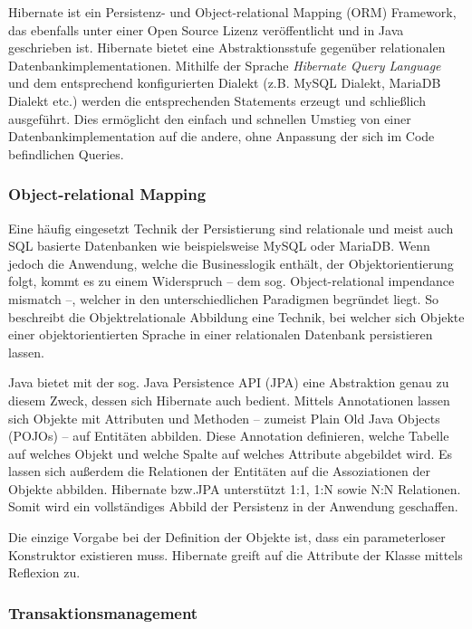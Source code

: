 			Hibernate ist ein Persistenz- und Object-relational Mapping (\ac{ORM}) Framework, das ebenfalls unter einer Open Source Lizenz veröffentlicht und in Java geschrieben ist. Hibernate bietet eine Abstraktionsstufe gegenüber relationalen Datenbankimplementationen. Mithilfe der Sprache \textit{Hibernate Query Language} und dem entsprechend konfigurierten Dialekt (z.B. MySQL Dialekt, MariaDB Dialekt etc.) werden die entsprechenden Statements erzeugt und schließlich ausgeführt. Dies ermöglicht den einfach und schnellen Umstieg von einer Datenbankimplementation auf die andere, ohne Anpassung der sich im Code befindlichen Queries. 
			
			\subsubsection{Object-relational Mapping} %
		
				Eine häufig eingesetzt Technik der Persistierung sind relationale und meist auch \ac{SQL} basierte Datenbanken wie beispielsweise MySQL oder MariaDB. Wenn jedoch die Anwendung, welche die Businesslogik enthält, der Objektorientierung folgt, kommt es zu einem Widerspruch -- dem sog. Object-relational impendance mismatch --, welcher in den unterschiedlichen Paradigmen begründet liegt. So beschreibt die Objektrelationale Abbildung eine Technik, bei welcher sich Objekte einer objektorientierten Sprache in einer relationalen Datenbank persistieren lassen. 
					
				Java bietet mit der sog. Java Persistence API (\ac{JPA}) eine Abstraktion genau zu diesem Zweck, dessen sich Hibernate auch bedient. Mittels Annotationen lassen sich Objekte mit Attributen und Methoden -- zumeist Plain Old Java Objects (\ac{POJO}s) -- auf Entitäten abbilden. Diese Annotation definieren, welche Tabelle auf welches Objekt und welche Spalte auf welches Attribute abgebildet wird. Es lassen sich außerdem die Relationen der Entitäten auf die Assoziationen der Objekte abbilden. Hibernate bzw.\ac{JPA} unterstützt 1:1, 1:N sowie N:N Relationen. Somit wird ein vollständiges Abbild der Persistenz in der Anwendung geschaffen.
				
				Die einzige Vorgabe bei der Definition der Objekte ist, dass ein parameterloser Konstruktor existieren muss. Hibernate greift auf die Attribute der Klasse mittels Reflexion zu. 
				
			\subsubsection{Transaktionsmanagement} %
			
